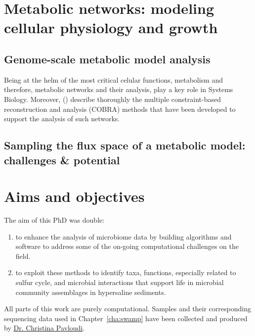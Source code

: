\section{Metabolic networks: modeling  cellular physiology and growth}


% 
   \subsection*{Genome-scale metabolic model analysis}



      Being at the helm of the most critical celular functions, 
      metabolism and therefore, metabolic networks and their analysis, 
      play a key role in Systems Biology. 
      Moreover, \citeauthor{lewis2012constraining} (\citeyear{lewis2012constraining}) 
      describe thoroughly the multiple constraint-based reconstruction and analysis (COBRA) methods 
      that have been developed to support the analysis of such networks. 
   \subsection*{Sampling the flux space of a metabolic model: challenges \& potential}





\section{Aims and objectives}

   The aim of this PhD was double:
   \begin{enumerate}
      \item to enhance the analysis of microbiome data by building algorithms and software 
            to address some of the on-going computational challenges on the field.
      \item to exploit these methods to identify taxa, functions, especially related to sulfur cycle, 
            and microbial interactions that support life in microbial community assemblages in hypersaline sediments.
   \end{enumerate}
   All parts of this work are purely computational. 
   Samples and their corresponding sequencing data used in Chapter~\ref{cha:swamp} have been collected 
   and produced by \href{https://scholar.google.com/citations?user=3zs1rNkAAAAJ&hl=en&oi=sra}{Dr. Christina Pavloudi}. 

